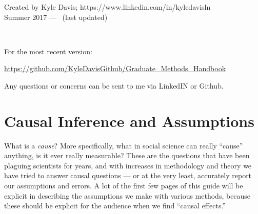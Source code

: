 \documentclass[12pt]{article}\usepackage[]{graphicx}\usepackage[]{color}
\begin{document}
\begin{flushleft}
\begin{center}
Created by Kyle Davis; https://www.linkedin.com/in/kyledavisln \\
Summer 2017 --- \thedate ~(last updated)

\

For the most recent version:

\begin{center}
\url{https://github.com/KyleDavisGithub/Graduate_Methods_Handbook}
\end{center}

Any questions or concerns can be sent to me via LinkedIN or Github.
\end{center}

\clearpage
\tableofcontents
\thispagestyle{empty}


\clearpage
\setcounter{page}{1}

\section{Causal Inference and Assumptions}

What is a \textit{cause}? More specifically, what in social science can really ``cause'' anything, is it ever really measurable? These are the questions that have been plaguing scientists for years, and with increases in methodology and theory we have tried to answer causal questions --- or at the very least, accurately report our assumptions and errors. A lot of the first few pages of this guide will be explicit in describing the assumptions we make with various methods, because these should be explicit for the audience when we find ``causal effects.''


\end{flushleft}
\end{document}

